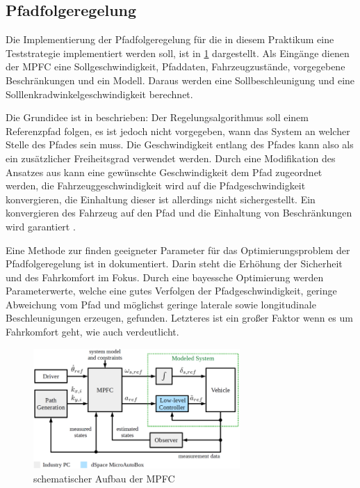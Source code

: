 \subsection{Pfadfolgeregelung}
Die Implementierung der Pfadfolgeregelung für die in diesem Praktikum eine Teststrategie implementiert werden soll, ist in \ref{fig:MPFC_Schema} dargestellt. Als Eingänge dienen der MPFC eine Sollgeschwindigkeit, Pfaddaten, Fahrzeugzustände, vorgegebene Beschränkungen und ein Modell. Daraus werden eine Sollbeschleunigung und eine Solllenkradwinkelgeschwindigkeit berechnet.

Die Grundidee ist in \cite{Faulwasser2009} beschrieben: Der Regelungsalgorithmus soll einem Referenzpfad folgen, es ist jedoch nicht vorgegeben, wann das System an welcher Stelle des Pfades sein muss. Die Geschwindigkeit entlang des Pfades kann also als ein zusätzlicher Freiheitsgrad verwendet werden. Durch eine Modifikation des Ansatzes aus \cite{Faulwasser2009} kann eine gewünschte Geschwindigkeit dem Pfad zugeordnet werden, die Fahrzeuggeschwindigkeit wird auf die Pfadgeschwindigkeit konvergieren, die Einhaltung dieser ist allerdings nicht sichergestellt. Ein konvergieren des Fahrzeug auf den Pfad und die Einhaltung von Beschränkungen wird garantiert \cite{ritschel2019}.

Eine Methode zur finden geeigneter Parameter für das Optimierungsproblem der Pfadfolgeregelung ist in \cite{math11020465} dokumentiert. Darin steht die Erhöhung der Sicherheit und des Fahrkomfort im Fokus. Durch eine bayessche Optimierung werden Parameterwerte, welche eine gutes Verfolgen der Pfadgeschwindigkeit, geringe Abweichung vom Pfad und möglichst geringe laterale sowie longitudinale Beschleunigungen erzeugen, gefunden. Letzteres ist ein großer Faktor wenn es um Fahrkomfort geht, wie  auch \cite{BELLEM201890} verdeutlicht.
\begin{figure}[H]
    \centering
    \includegraphics[width=0.7\textwidth]{figures/2_Grundlagen/MPFC_Schema.png}
    \caption{schematischer Aufbau der MPFC \cite{ritschel2019}}
    \label{fig:MPFC_Schema}
\end{figure}
    
